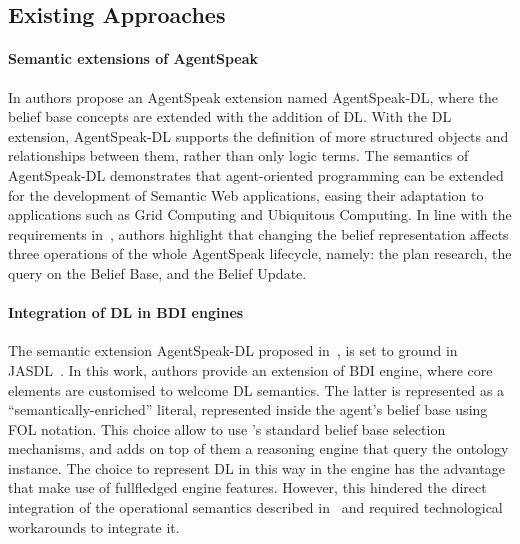 \documentclass[
]{ceurart}
\begin{document}
\subsection{Existing Approaches}
\label{subsec:existing-approaches}

\paragraph{Semantic extensions of AgentSpeak}
In \cite{DBLP:conf/dalt/MoreiraVBH05} authors propose an AgentSpeak extension named AgentSpeak-DL, 
where the belief base concepts are extended with the addition of \ac{DL}.
%
With the \ac{DL} extension, 
AgentSpeak-DL supports the definition of more structured objects and relationships between them, 
rather than only logic terms.
%
The semantics of AgentSpeak-DL demonstrates that agent-oriented programming can be extended for the development of Semantic Web applications, 
easing their adaptation to applications such as Grid Computing and Ubiquitous Computing.
%
In line with the requirements in~, 
authors highlight that changing the belief representation affects three operations of the whole AgentSpeak lifecycle, namely: the plan research, the query on the Belief Base, and the Belief Update.

\paragraph{Integration of DL in BDI engines}
The semantic extension AgentSpeak-DL proposed in~\cite{DBLP:conf/dalt/MoreiraVBH05}, 
is set to ground in JASDL~\cite{DBLP:conf/dalt/KlapiscakB08}.
%
In this work, 
authors provide an extension of \jason{} \ac{BDI} engine, 
where core elements are customised to welcome \ac{DL} semantics.
%
The latter is represented as a ``semantically-enriched'' literal,
represented inside the agent's belief base using FOL notation.
%
This choice allow to use \jason{}'s standard belief base selection mechanisms, 
and adds on top of them a reasoning engine that query the ontology instance.
%
The choice to represent \ac{DL} in this way in the engine has the advantage that make use of fullfledged \jason{} engine features.
%
However, 
this hindered the direct integration of the operational semantics described in~\cite{DBLP:conf/dalt/KlapiscakB08} 
and required technological workarounds to integrate it.
%
\end{document}
